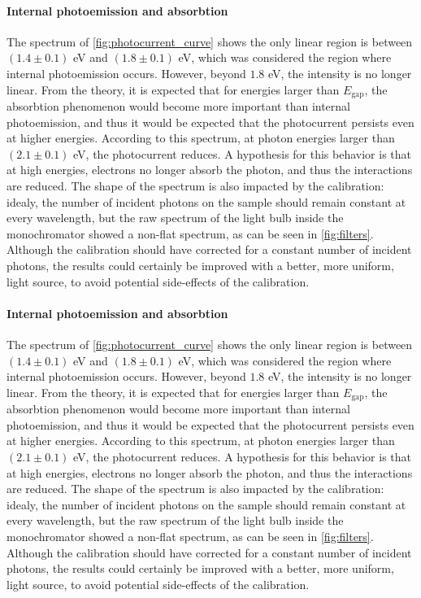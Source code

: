 \paragraph{Internal photoemission and absorbtion}
The spectrum of \autoref{fig:photocurrent_curve} shows the only linear region is between $(1.4 \pm 0.1)$ eV and $(1.8 \pm 0.1)$ eV, which was considered the region where internal photoemission occurs. However, beyond $1.8$ eV, the intensity is no longer linear. From the theory, it is expected that for energies larger than $E_\textrm{gap}$, the absorbtion phenomenon would become more important than internal photoemission, and thus it would be expected that the photocurrent persists even at higher energies. According to this spectrum, at photon energies larger than $(2.1 \pm 0.1)$ eV, the photocurrent reduces. A hypothesis for this behavior is that at high energies, electrons no longer absorb the photon, and thus the interactions are reduced.
The shape of the spectrum is also impacted by the calibration: idealy, the number of incident photons on the sample should remain constant at every wavelength, but the raw spectrum of the light bulb inside the monochromator showed a non-flat spectrum, as can be seen in \autoref{fig:filters}. Although the calibration should have corrected for a constant number of incident photons, the results could certainly be improved with a better, more uniform, light source, to avoid potential side-effects of the calibration.

\paragraph{Internal photoemission and absorbtion}
The spectrum of \autoref{fig:photocurrent_curve} shows the only linear region is between $(1.4 \pm 0.1)$ eV and $(1.8 \pm 0.1)$ eV, which was considered the region where internal photoemission occurs. However, beyond $1.8$ eV, the intensity is no longer linear. From the theory, it is expected that for energies larger than $E_\textrm{gap}$, the absorbtion phenomenon would become more important than internal photoemission, and thus it would be expected that the photocurrent persists even at higher energies. According to this spectrum, at photon energies larger than $(2.1 \pm 0.1)$ eV, the photocurrent reduces. A hypothesis for this behavior is that at high energies, electrons no longer absorb the photon, and thus the interactions are reduced.
The shape of the spectrum is also impacted by the calibration: idealy, the number of incident photons on the sample should remain constant at every wavelength, but the raw spectrum of the light bulb inside the monochromator showed a non-flat spectrum, as can be seen in \autoref{fig:filters}. Although the calibration should have corrected for a constant number of incident photons, the results could certainly be improved with a better, more uniform, light source, to avoid potential side-effects of the calibration.